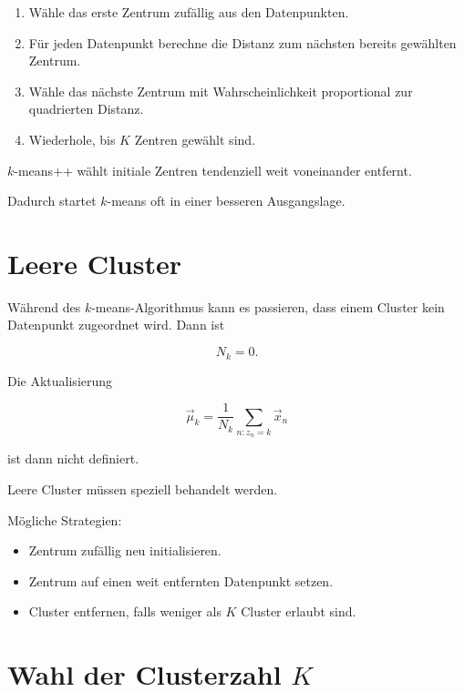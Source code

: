 \begin{enumerate}
    \item Wähle das erste Zentrum zufällig aus den Datenpunkten.
    \item Für jeden Datenpunkt berechne die Distanz zum nächsten bereits gewählten Zentrum.
    \item Wähle das nächste Zentrum mit Wahrscheinlichkeit proportional zur quadrierten Distanz.
    \item Wiederhole, bis \(K\) Zentren gewählt sind.
\end{enumerate}

\begin{conceptbox}
\(k\)-means++ wählt initiale Zentren tendenziell weit voneinander entfernt.

Dadurch startet \(k\)-means oft in einer besseren Ausgangslage.
\end{conceptbox}

\section{Leere Cluster}

Während des \(k\)-means-Algorithmus kann es passieren, dass einem Cluster kein Datenpunkt zugeordnet wird.
Dann ist

\[
    N_k=0.
\]

Die Aktualisierung

\[
    \vec{\mu}_k
    =
    \frac{1}{N_k}
    \sum_{n:z_n=k}
    \vec{x}_n
\]

ist dann nicht definiert.

\begin{notebox}
Leere Cluster müssen speziell behandelt werden.

Mögliche Strategien:

\begin{itemize}
    \item Zentrum zufällig neu initialisieren.
    \item Zentrum auf einen weit entfernten Datenpunkt setzen.
    \item Cluster entfernen, falls weniger als \(K\) Cluster erlaubt sind.
\end{itemize}
\end{notebox}

\section{Wahl der Clusterzahl \(K\)}

